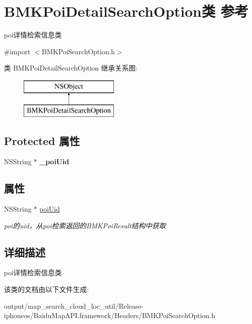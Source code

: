 \hypertarget{interface_b_m_k_poi_detail_search_option}{}\section{B\+M\+K\+Poi\+Detail\+Search\+Option类 参考}
\label{interface_b_m_k_poi_detail_search_option}


poi详情检索信息类  




{\ttfamily \#import $<$B\+M\+K\+Poi\+Search\+Option.\+h$>$}

类 B\+M\+K\+Poi\+Detail\+Search\+Option 继承关系图\+:\begin{figure}[H]
\begin{center}
\leavevmode
\includegraphics[height=2.000000cm]{interface_b_m_k_poi_detail_search_option}
\end{center}
\end{figure}
\subsection*{Protected 属性}
\begin{DoxyCompactItemize}
\item 
\hypertarget{interface_b_m_k_poi_detail_search_option_a9cbce2578220c6a05536df2200013659}{}N\+S\+String $\ast$ {\bfseries \+\_\+poi\+Uid}\label{interface_b_m_k_poi_detail_search_option_a9cbce2578220c6a05536df2200013659}

\end{DoxyCompactItemize}
\subsection*{属性}
\begin{DoxyCompactItemize}
\item 
\hypertarget{interface_b_m_k_poi_detail_search_option_a270c8018741875dc0bd80018b077952d}{}N\+S\+String $\ast$ \hyperlink{interface_b_m_k_poi_detail_search_option_a270c8018741875dc0bd80018b077952d}{poi\+Uid}\label{interface_b_m_k_poi_detail_search_option_a270c8018741875dc0bd80018b077952d}

\begin{DoxyCompactList}\small\item\em poi的uid，从poi检索返回的\+B\+M\+K\+Poi\+Result结构中获取 \end{DoxyCompactList}\end{DoxyCompactItemize}


\subsection{详细描述}
poi详情检索信息类 

该类的文档由以下文件生成\+:\begin{DoxyCompactItemize}
\item 
output/map\+\_\+search\+\_\+cloud\+\_\+loc\+\_\+util/\+Release-\/iphoneos/\+Baidu\+Map\+A\+P\+I.\+framework/\+Headers/B\+M\+K\+Poi\+Search\+Option.\+h\end{DoxyCompactItemize}
